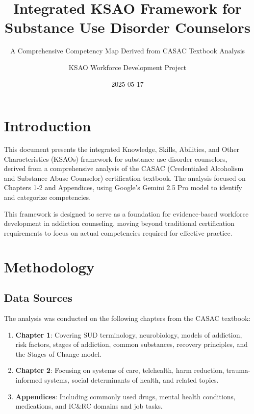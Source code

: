 \documentclass[
  letterpaper,
  DIV=11,
  numbers=noendperiod]{scrartcl}
\title{Integrated KSAO Framework for Substance Use Disorder Counselors}
\subtitle{A Comprehensive Competency Map Derived from CASAC Textbook
Analysis}
\author{KSAO Workforce Development Project}
\date{2025-05-17}
\renewcommand*\contentsname{Table of contents}
\newcommand\contentsname{Table of contents}
\begin{document}
\maketitle

\renewcommand*\contentsname{Table of contents}
{
\hypersetup{linkcolor=}
\setcounter{tocdepth}{3}
\tableofcontents
}

\section{Introduction}\label{introduction}

This document presents the integrated Knowledge, Skills, Abilities, and
Other Characteristics (KSAOs) framework for substance use disorder
counselors, derived from a comprehensive analysis of the CASAC
(Credentialed Alcoholism and Substance Abuse Counselor) certification
textbook. The analysis focused on Chapters 1-2 and Appendices, using
Google's Gemini 2.5 Pro model to identify and categorize competencies.

This framework is designed to serve as a foundation for evidence-based
workforce development in addiction counseling, moving beyond traditional
certification requirements to focus on actual competencies required for
effective practice.

\section{Methodology}\label{methodology}

\subsection{Data Sources}\label{data-sources}

The analysis was conducted on the following chapters from the CASAC
textbook:

\begin{enumerate}
\def\labelenumi{\arabic{enumi}.}
\item
  \textbf{Chapter 1}: Covering SUD terminology, neurobiology, models of
  addiction, risk factors, stages of addiction, common substances,
  recovery principles, and the Stages of Change model.
\item
  \textbf{Chapter 2}: Focusing on systems of care, telehealth, harm
  reduction, trauma-informed systems, social determinants of health, and
  related topics.
\item
  \textbf{Appendices}: Including commonly used drugs, mental health
  conditions, medications, and IC\&RC domains and job tasks.
\end{enumerate}
\end{document}
